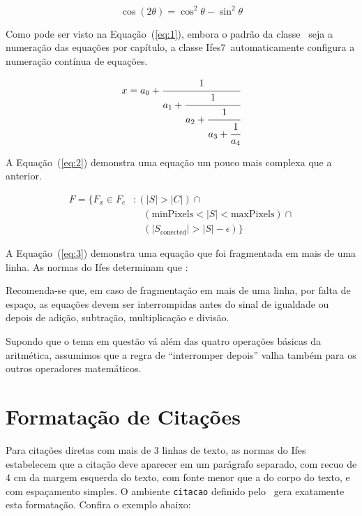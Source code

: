 \documentclass[times,english,brazil,oneside]{ifes8}
\newcommand{\ifestex}{\textsf{Ifes$7$}}
\begin{document}
\begin{equation}
  \label{eq:1}
  \cos (2\theta) = \cos^2 \theta - \sin^2 \theta
\end{equation}

Como pode ser visto na Equação~(\ref{eq:1}), embora o padrão da classe
\abnTeX\ seja a numeração das equações por capítulo, a classe
\ifestex\ automaticamente configura a numeração contínua de equações.

\begin{equation}
  \label{eq:2}
  x = a_0 + \cfrac{1}{a_1 
    + \cfrac{1}{a_2 
      + \cfrac{1}{a_3 + \cfrac{1}{a_4}}}}
\end{equation}

A Equação~(\ref{eq:2}) demonstra uma equação um pouco mais complexa
que a anterior.

\begin{equation}
  \label{eq:3}
  \begin{split}
    F = \{F_{x} \in  F_{c} &: (|S| > |C|) \cap {}\\
    &\quad (\text{minPixels}  < |S| < \text{maxPixels}) \cap {} \\
    &\quad (|S_{\text{conected}}| > |S| - \epsilon) \}
  \end{split}
\end{equation}

A Equação~(\ref{eq:3}) demonstra uma equação que foi fragmentada em
mais de uma linha. As normas do Ifes determinam que
\cite[p.~38]{Ifes2014}:

\begin{citacao}
  Recomenda-se que, em caso de fragmentação em mais de uma linha, por
  falta de espaço, as equações devem ser interrompidas antes do sinal
  de igualdade ou depois de adição, subtração, multiplicação e
  divisão.
\end{citacao}

Supondo que o tema em questão vá além das quatro operações básicas da
aritmética, assumimos que a regra de ``interromper depois'' valha
também para os outros operadores matemáticos.


\section{Formatação de Citações}
\label{sec:format-citac}

Para citações diretas com mais de 3 linhas de texto, as normas do Ifes
estabelecem que a citação deve aparecer em um parágrafo separado, com
recuo de 4 cm da margem esquerda do texto, com fonte menor que a do
corpo do texto, e com espaçamento simples. O ambiente \texttt{citacao}
definido pelo \abnTeX\ gera exatamente esta formatação. Confira o
exemplo abaixo:
\end{document}
